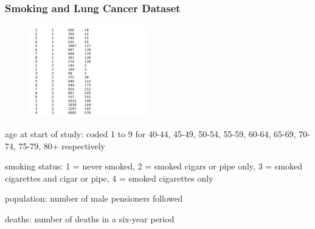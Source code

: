 \documentclass{beamer}
\begin{document}
\begin{frame}[fragile]\frametitle{Smoking and Lung Cancer Dataset}

	\begin{figure}
	\centering
		\includegraphics[height=4cm]{"data"}
	\end{figure}

	\begin{itemize}
		\footnotesize{
			\item age at start of study: coded 1 to 9 for 40-44, 45-49, 50-54, 55-59, 60-64, 65-69, 70-74, 75-79, 80+ respectively
			\item smoking status: 1 = never smoked, 2 = smoked cigars or pipe only, 3 = smoked cigarettes and cigar or pipe, 4 = smoked cigarettes only
			\item population: number of male pensioners followed
			\item deaths: number of deaths in a six-year period
		}
	\end{itemize}

\end{frame}
\end{document}
